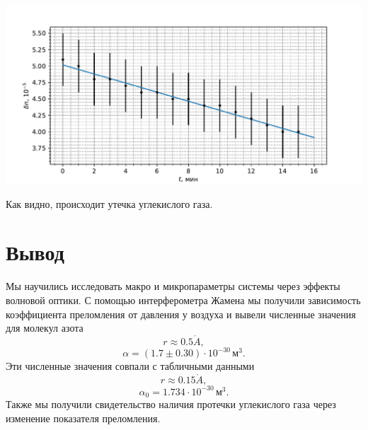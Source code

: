 \documentclass[a4paper,12pt]{article}
\renewcommand{\AA}{\ensuremath{\mathring{A}}}
\begin{document}
\begin{center}
\includegraphics[width=\textwidth]{time.pdf}
\end{center}

Как видно, происходит утечка углекислого газа.


\section*{Вывод}
Мы научились исследовать макро и микропараметры системы через эффекты волновой оптики. С помощью интерферометра Жамена мы получили зависимость коэффициента преломления от давления у воздуха и вывели численные значения для молекул азота
\[r \approx 0.5 \AA,\]
\[\alpha = (1.7\pm0.30) \cdot 10^{-30}\,\text{м}^3.\]
Эти численные значения совпали с табличными данными
\[r \approx 0.15 \AA,\]
\[\alpha_0 = 1.734 \cdot 10^{-30}\,\text{м}^3.\]
Также мы получили свидетельство наличия протечки углекислого газа через изменение показателя преломления.
\end{document}
